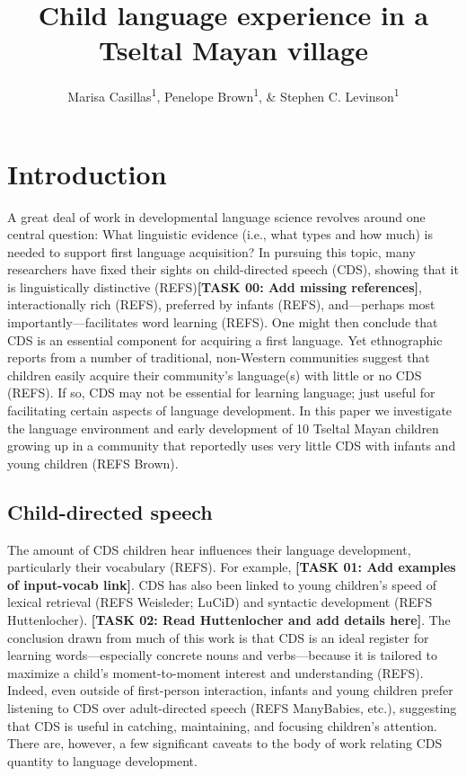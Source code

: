 \documentclass[man]{apa6}
\title{Child language experience in a Tseltal Mayan village}
\author{Marisa Casillas\textsuperscript{1}, Penelope Brown\textsuperscript{1}, \& Stephen C. Levinson\textsuperscript{1}}
\affiliation{
    \vspace{0.5cm}
          \textsuperscript{1} Max Planck Institute for Psycholinguistics  }
\theoremstyle{definition}
\theoremstyle{definition}
\theoremstyle{definition}
\theoremstyle{remark}
\begin{document}
\maketitle

\setcounter{secnumdepth}{0}



\section{Introduction}\label{intro}

A great deal of work in developmental language science revolves around
one central question: What linguistic evidence (i.e., what types and how
much) is needed to support first language acquisition? In pursuing this
topic, many researchers have fixed their sights on child-directed speech
(CDS), showing that it is linguistically distinctive
(REFS)\textbf{{[}TASK 00: Add missing references{]}}, interactionally
rich (REFS), preferred by infants (REFS), and---perhaps most
importantly---facilitates word learning (REFS). One might then conclude
that CDS is an essential component for acquiring a first language. Yet
ethnographic reports from a number of traditional, non-Western
communities suggest that children easily acquire their community's
language(s) with little or no CDS (REFS). If so, CDS may not be
essential for learning language; just useful for facilitating certain
aspects of language development. In this paper we investigate the
language environment and early development of 10 Tseltal Mayan children
growing up in a community that reportedly uses very little CDS with
infants and young children (REFS Brown).

\subsection{Child-directed speech}\label{intro-cds}

The amount of CDS children hear influences their language development,
particularly their vocabulary (REFS). For example, \textbf{{[}TASK 01:
Add examples of input-vocab link{]}}. CDS has also been linked to young
children's speed of lexical retrieval (REFS Weisleder; LuCiD) and
syntactic development (REFS Huttenlocher). \textbf{{[}TASK 02: Read
Huttenlocher and add details here{]}}. The conclusion drawn from much of
this work is that CDS is an ideal register for learning
words---especially concrete nouns and verbs---because it is tailored to
maximize a child's moment-to-moment interest and understanding (REFS).
Indeed, even outside of first-person interaction, infants and young
children prefer listening to CDS over adult-directed speech (REFS
ManyBabies, etc.), suggesting that CDS is useful in catching,
maintaining, and focusing children's attention. There are, however, a
few significant caveats to the body of work relating CDS quantity to
language development.
\end{document}
